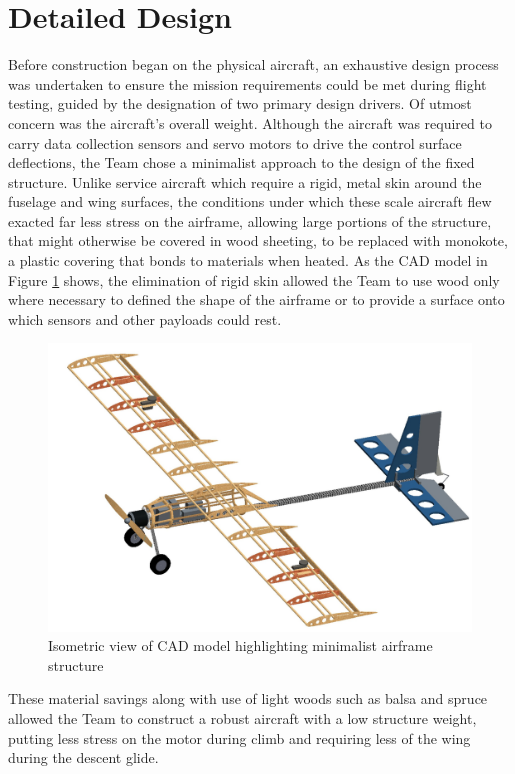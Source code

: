 \documentclass[titlepage]{article}
\begin{document}
\section{Detailed Design}
\label{design}
Before construction began on the physical aircraft, an exhaustive design process was undertaken to ensure the mission requirements could be met during flight testing, guided by the designation of two primary design drivers. Of utmost concern was the aircraft's overall weight. Although the aircraft was required to carry data collection sensors and servo motors to drive the control surface deflections, the Team chose a minimalist approach to the design of the fixed structure. Unlike service aircraft which require a rigid, metal skin around the fuselage and wing surfaces, the conditions under which these scale aircraft flew exacted far less stress on the airframe, allowing large portions of the structure, that might otherwise be covered in wood sheeting, to be replaced with monokote, a plastic covering that bonds to materials when heated. As the CAD model in Figure \ref{noskin} shows, the elimination of rigid skin allowed the Team to use wood only where necessary to defined the shape of the airframe or to provide a surface onto which sensors and other payloads could rest.
\begin{figure}[h]
\includegraphics[width=1\columnwidth]{Full_No_Caption.jpg}
\caption{Isometric view of CAD model highlighting minimalist airframe structure}
\label{noskin}
\end{figure}
These material savings along with use of light woods such as balsa and spruce allowed the Team to construct a robust aircraft with a low structure weight, putting less stress on the motor during climb and requiring less of the wing during the descent glide.
\end{document}
